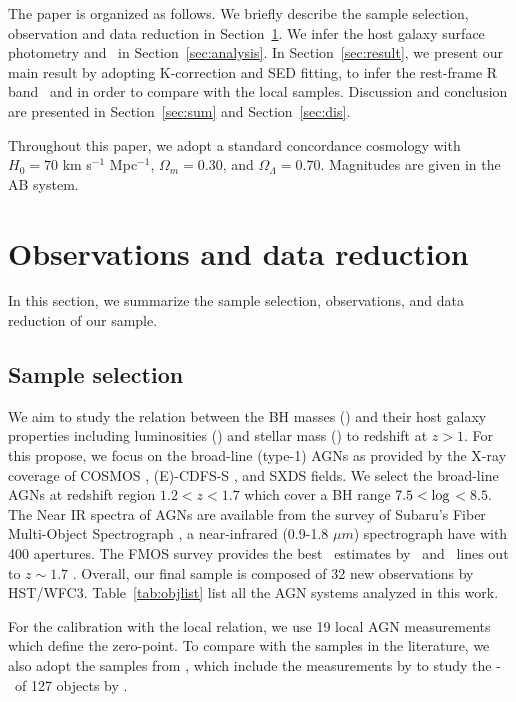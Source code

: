 \documentclass[apj]{emulateapj}
\begin{document}
The paper is organized as follows. We briefly describe the sample selection, observation and data reduction in Section~\ref{sec:data}. We infer the host galaxy surface photometry and \mbh\ in Section~\ref{sec:analysis}. In Section~\ref{sec:result}, we present our main result by adopting K-correction and SED fitting, to infer the rest-frame R band \lhost\ and \smass in order to compare with the local samples. Discussion and conclusion are presented in Section~\ref{sec:sum} and Section~\ref{sec:dis}. 

Throughout this paper, we adopt a standard concordance cosmology with $H_0= 70$ km s$^{-1}$ Mpc$^{-1}$, $\Omega{_m} = 0.30$, and $\Omega{_\Lambda} =
0.70$. Magnitudes are given in the AB system.

\section{Observations and data reduction}
\label{sec:data}
In this section, we summarize the sample selection, observations, and data reduction of our sample. 

\subsection{Sample selection}

We aim to study the relation between the BH masses (\mbh) and their host galaxy properties including luminosities (\lhost) and stellar mass (\smass) to redshift at $z>1$. For this propose, we focus on the broad-line (type-1) AGNs as provided by the X-ray coverage of COSMOS \citep{Civano2016}, (E)-CDFS-S \citep{Lehmer2005, Xue2011}, and SXDS \citep{Ueda2008} fields. We select the broad-line AGNs at redshift region $1.2<z<1.7$ which cover a BH range $7.5<{\rm log}$\mbh $<8.5$. The Near IR spectra of AGNs are available from the survey of Subaru's Fiber Multi-Object Spectrograph \citep[FMOS, ][]{Kimura2010, Schulze2018}, a near-infrared (0.9-1.8 $\mu m$) spectrograph have with 400 apertures. The FMOS survey provides the best \mbh\ estimates by \halpha\ and \hbeta\ lines out to $z\sim1.7$ \citep{Greene2005, Matsuoka2013, Nobuta2012}. Overall, our final sample is composed of 32 new observations by HST/WFC3. Table~\ref{tab:objlist} list all the AGN systems analyzed in this work.

For the calibration with the local relation, we use 19 local AGN measurements \citep{Ben++10, Peterson2004} which define the zero-point. 
To compare with the samples in the literature, we also adopt the samples from \citet{Ding2017b}, which include the measurements by \citet{Pen++06qsob, Park15} to study the \mbh-\lhost\ of 127 objects by \hst.
\end{document}
